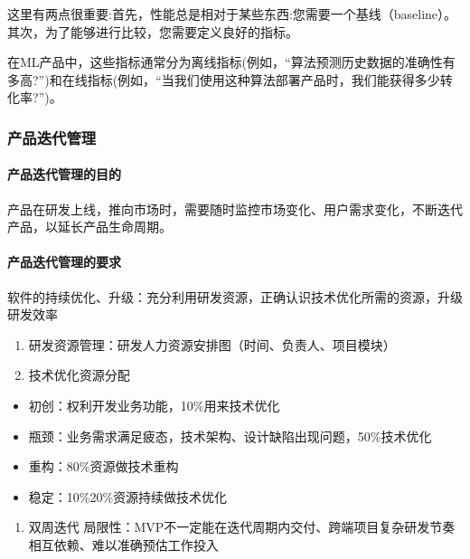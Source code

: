 \documentclass[letterpaper,11pt,english]{sphinxmanual}
\begin{document}
这里有两点很重要:首先，性能总是相对于某些东西:您需要一个基线（baseline）。其次，为了能够进行比较，您需要定义良好的指标。

在ML产品中，这些指标通常分为离线指标(例如，“算法预测历史数据的准确性有多高?”)和在线指标(例如，“当我们使用这种算法部署产品时，我们能获得多少转化率?”)。


\subsubsection{产品迭代管理}
\label{\detokenize{chapter_knowledge/upgrade_manage:id1}}\label{\detokenize{chapter_knowledge/upgrade_manage::doc}}

\paragraph{产品迭代管理的目的}
\label{\detokenize{chapter_knowledge/upgrade_manage:id2}}
产品在研发上线，推向市场时，需要随时监控市场变化、用户需求变化，不断迭代产品，以延长产品生命周期。


\paragraph{产品迭代管理的要求}
\label{\detokenize{chapter_knowledge/upgrade_manage:id3}}
软件的持续优化、升级：充分利用研发资源，正确认识技术优化所需的资源，升级研发效率
\begin{enumerate}
%
\item {} 
研发资源管理：研发人力资源安排图（时间、负责人、项目模块）

\item {} 
技术优化资源分配

\end{enumerate}
\begin{itemize}
\item {} 
初创：权利开发业务功能，10\%用来技术优化

\item {} 
瓶颈：业务需求满足疲态，技术架构、设计缺陷出现问题，50\%技术优化

\item {} 
重构：80\%资源做技术重构

\item {} 
稳定：10\%\sphinxhyphen{}20\%资源持续做技术优化

\end{itemize}
\begin{enumerate}
%
\item {} 
双周迭代
局限性：MVP不一定能在迭代周期内交付、跨端项目复杂研发节奏相互依赖、难以准确预估工作投入

\end{enumerate}
\end{document}
